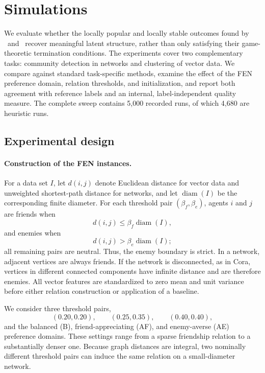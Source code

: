 \section{Simulations}
\label{sec:simulations}

We evaluate whether the locally popular and locally stable outcomes found by
\alglocpop\ and \alglocstab\ recover meaningful latent structure, rather than
only satisfying their game-theoretic termination conditions.  The experiments
cover two complementary tasks: community detection in networks and clustering
of vector data.  We compare against standard task-specific methods, examine the
effect of the FEN preference domain, relation thresholds, and initialization,
and report both agreement with reference labels and an internal,
label-independent quality measure.  The complete sweep contains 5,000 recorded
runs, of which 4,680 are heuristic runs.

\subsection{Experimental design}
\label{sec:sim-design}

\paragraph{Construction of the FEN instances.}
For a data set \(I\), let \(d(i,j)\) denote Euclidean distance for vector data
and unweighted shortest-path distance for networks, and let
\(\operatorname{diam}(I)\) be the corresponding finite diameter.  For each
threshold pair \((\beta_f,\beta_e)\), agents \(i\) and \(j\) are friends when
\[
 d(i,j)\leq \beta_f\operatorname{diam}(I),
\]
and enemies when
\[
 d(i,j)>\beta_e\operatorname{diam}(I);
\]
all remaining pairs are neutral.  Thus, the enemy boundary is strict.  In a
network, adjacent vertices are always friends.  If the network is
disconnected, as in Cora, vertices in different connected components have
infinite distance and are therefore enemies.  All vector features are
standardized to zero mean and unit variance before either relation construction
or application of a baseline.

We consider three threshold pairs,
\[
 (0.20,0.20),\qquad (0.25,0.35),\qquad (0.40,0.40),
\]
and the balanced (B), friend-appreciating (AF), and enemy-averse (AE)
preference domains.  These settings range from a sparse friendship relation to
a substantially denser one.  Because graph distances are integral, two
nominally different threshold pairs can induce the same relation on a
small-diameter network.

